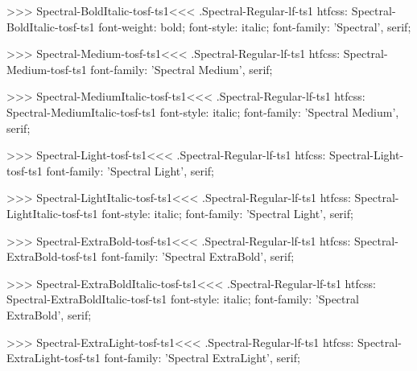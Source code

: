 >>>
\<Spectral-BoldItalic-tosf-ts1\><<<
.Spectral-Regular-lf-ts1
htfcss:  Spectral-BoldItalic-tosf-ts1  font-weight: bold; font-style: italic; font-family: 'Spectral', serif;

>>>
\<Spectral-Medium-tosf-ts1\><<<
.Spectral-Regular-lf-ts1
htfcss:  Spectral-Medium-tosf-ts1  font-family: 'Spectral Medium', serif;

>>>
\<Spectral-MediumItalic-tosf-ts1\><<<
.Spectral-Regular-lf-ts1
htfcss:  Spectral-MediumItalic-tosf-ts1  font-style: italic; font-family: 'Spectral Medium', serif;

>>>
\<Spectral-Light-tosf-ts1\><<<
.Spectral-Regular-lf-ts1
htfcss:  Spectral-Light-tosf-ts1  font-family: 'Spectral Light', serif;

>>>
\<Spectral-LightItalic-tosf-ts1\><<<
.Spectral-Regular-lf-ts1
htfcss:  Spectral-LightItalic-tosf-ts1  font-style: italic; font-family: 'Spectral Light', serif;

>>>
\<Spectral-ExtraBold-tosf-ts1\><<<
.Spectral-Regular-lf-ts1
htfcss:  Spectral-ExtraBold-tosf-ts1  font-family: 'Spectral ExtraBold', serif;

>>>
\<Spectral-ExtraBoldItalic-tosf-ts1\><<<
.Spectral-Regular-lf-ts1
htfcss:  Spectral-ExtraBoldItalic-tosf-ts1  font-style: italic; font-family: 'Spectral ExtraBold', serif;

>>>
\<Spectral-ExtraLight-tosf-ts1\><<<
.Spectral-Regular-lf-ts1
htfcss:  Spectral-ExtraLight-tosf-ts1  font-family: 'Spectral ExtraLight', serif;

